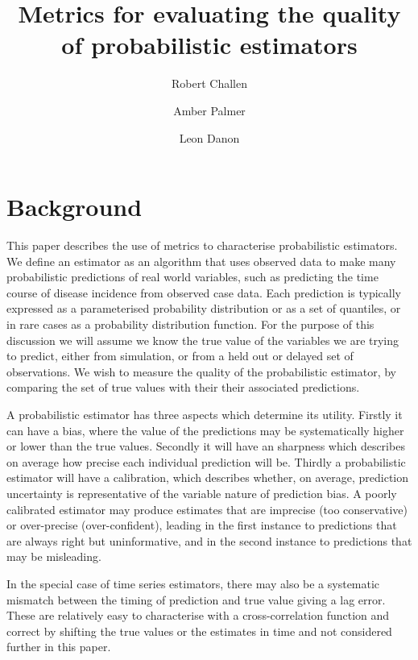 \documentclass[a4paper, 12pt, twoside]{article}
\title{Metrics for evaluating the quality of probabilistic estimators}
\author[1,2]{Robert Challen}
\author[1,2]{Amber Palmer}
\author[1,2]{Leon Danon}
\affil[1]{AI4CI, University of Bristol, Bristol, UK.}
\affil[2]{Department of Engineering Mathematics, University of Bristol, Bristol, UK.}
\date{}                     %
\let\Oldsection\section
\renewcommand{\section}{\FloatBarrier\Oldsection}
\begin{document}
\maketitle

\section{Background}

This paper describes the use of metrics to characterise probabilistic estimators. We define an estimator as an algorithm that uses observed data to make many probabilistic predictions of real world variables, such as predicting the time course of disease incidence from observed case data. Each prediction is typically expressed as a parameterised probability distribution or as a set of quantiles, or in rare cases as a probability distribution function. For the purpose of this discussion we will assume we know the true value of the variables we are trying to predict, either from simulation, or from a held out or delayed set of observations. We wish to measure the quality of the probabilistic estimator, by comparing the set of true values with their their associated predictions.


A probabilistic estimator has three aspects which determine its utility. Firstly it can have a bias, where the value of the predictions may be systematically higher or lower than the true values. Secondly it will have an sharpness which describes on average how precise each individual prediction will be. Thirdly a probabilistic estimator will have a calibration, which describes whether, on average, prediction uncertainty is representative of the variable nature of prediction bias. A poorly calibrated estimator may produce estimates that are imprecise (too conservative) or over-precise (over-confident), leading in the first instance to predictions that are always right but uninformative, and in the second instance to predictions that may be misleading.

In the special case of time series estimators, there may also be a systematic mismatch between the timing of prediction and true value giving a lag error. These are relatively easy to characterise with a cross-correlation function and correct by shifting the true values or the estimates in time and not considered further in this paper.
\end{document}
